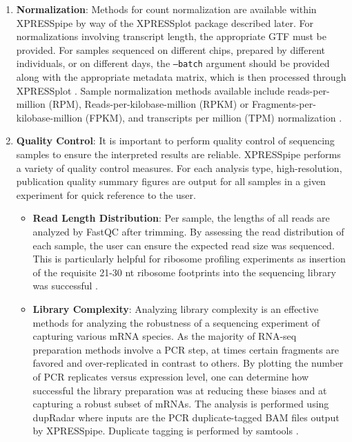 \documentclass[11pt, a4paper, oneside]{article}
\begin{document}
\begin{enumerate}
  \item \textbf{Normalization}: Methods for count normalization are available within XPRESSpipe by way of the XPRESSplot package described later. For normalizations involving transcript length, the appropriate GTF must be provided. For samples sequenced on different chips, prepared by different individuals, or on different days, the \texttt{--batch} argument should be provided along with the appropriate metadata matrix, which is then processed through XPRESSplot \cite{sva}. Sample normalization methods available include reads-per-million (RPM), Reads-per-kilobase-million (RPKM) or Fragments-per-kilobase-million (FPKM), and transcripts per million (TPM) normalization \cite{evans_briefbio}.


  \item \textbf{Quality Control}:
  It is important to perform quality control of sequencing samples to ensure the interpreted results are reliable. XPRESSpipe performs a variety of quality control measures. For each analysis type, high-resolution, publication quality summary figures are output for all samples in a given experiment for quick reference to the user.

    \begin{itemize}
      \item \textbf{Read Length Distribution}: Per sample, the lengths of all reads are analyzed by FastQC \cite{fastqc} after trimming. By assessing the read distribution of each sample, the user can ensure the expected read size was sequenced. This is particularly helpful for ribosome profiling experiments as insertion of the requisite 21-30 nt ribosome footprints into the sequencing library was successful \cite{ingolia_meth}.

      \item \textbf{Library Complexity}: Analyzing library complexity is an effective methods for analyzing the robustness of a sequencing experiment of capturing various mRNA species. As the majority of RNA-seq preparation methods involve a PCR step, at times certain fragments are favored and over-replicated in contrast to others. By plotting the number of PCR replicates versus expression level, one can determine how successful the library preparation was at reducing these biases and at capturing a robust subset of mRNAs. The analysis is performed using dupRadar \cite{dupradar} where inputs are the PCR duplicate-tagged BAM files output by XPRESSpipe. Duplicate tagging is performed by samtools \cite{samtools}.


\end{itemize}
\end{enumerate}
\end{document}
